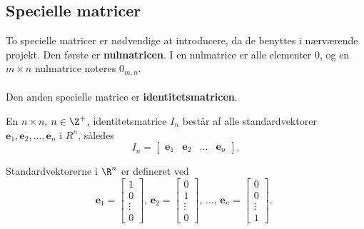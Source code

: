 \subsection{Specielle matricer} %

To specielle matricer er nødvendige at introducere, da de benyttes i nærværende projekt. Den første er \textbf{nulmatricen}. I en nulmatrice er alle elementer $0$, og en $m \times n$ nulmatrice noteres $0_{m,n}$.
% 
%
\\\\
Den anden specielle matrice er \textbf{identitetsmatricen}. 
%
\begin{defn}{}{}
%
En $n \times n$, $n \in \Z^+$, identitetsmatrice $I_n$ består af alle standardvektorer $\textbf{e}_1, \textbf{e}_2, \ldots, \textbf{e}_n$ i $R^n$, således 
$$
I_n=
\begin{bmatrix}
\textbf{e}_1 & \textbf{e}_2 & \ldots & \textbf{e}_n
\end{bmatrix}.
$$ 
\end{defn}
\noindent
%
Standardvektorerne i $\R^n$ er defineret ved 
%
%
$$
\textbf{e}_1=
\begin{bmatrix}
1 \\ 
0 \\ 
\vdots \\
0
\end{bmatrix}
\text{, }
\textbf{e}_2=
\begin{bmatrix}
0 \\ 
1 \\ 
\vdots \\
0
\end{bmatrix}
\text{, }
\ldots
\text{, }
\textbf{e}_n=
\begin{bmatrix}
0 \\ 
0 \\ 
\vdots \\
1
\end{bmatrix}
\text{. }
$$